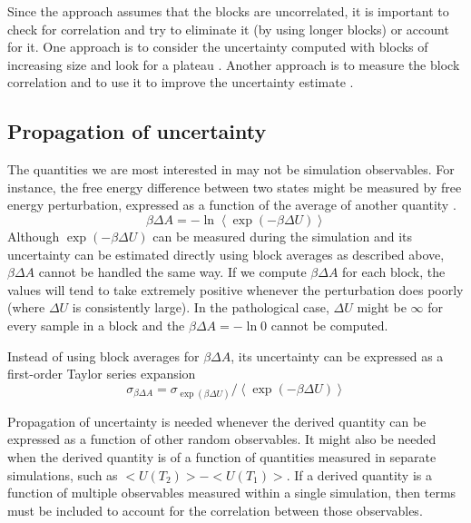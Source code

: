 Since the approach assumes that the blocks are uncorrelated, it is important to check for correlation and try to eliminate it (by using longer blocks) or account for it.  One approach is to consider the uncertainty computed with blocks of increasing size and look for a plateau \cite{Flyvbjerg-1989,Grossfield2009}.  Another approach is to measure the block correlation and to use it to improve the uncertainty estimate \cite{Kolafa1986}.

\subsection{Propagation of uncertainty}

The quantities we are most interested in may not be simulation observables.  For instance, the free energy difference between two states might be measured by free energy perturbation, expressed as a function of the average of another quantity \cite{Taylor1997}.
\begin{equation}
\beta \Delta A = -\ln \left< \exp \left(-\beta \Delta U\right) \right>
\end{equation}
Although $\exp(-\beta \Delta U)$ can be measured during the simulation and its uncertainty can be estimated directly using block averages as described above, $\beta \Delta A$ cannot be handled the same way.  If we compute $\beta \Delta A$ for each block, the values will tend to take extremely positive whenever the perturbation does poorly (where $\Delta U$ is consistently large).  In the pathological case, $\Delta U$ might be $\infty$ for every sample in a block and the $\beta \Delta A=-\ln 0$ cannot be computed. 


Instead of using block averages for $\beta \Delta A$, its uncertainty can be expressed as a first-order Taylor series expansion
\begin{equation}
  \sigma_{\beta \Delta A} = \sigma_{\exp(\beta \Delta U)} / \left< \exp \left(-\beta \Delta U\right) \right>
  \label{eq:propagation_bDA}
\end{equation}

Propagation of uncertainty is needed whenever the derived quantity can be expressed as a function of other random observables.  It might also be needed when the derived quantity is of a function of quantities measured in separate simulations, such as $<U(T_2)>-<U(T_1)>$.  If a derived quantity is a function of multiple observables measured within a single simulation, then terms must be included to account for the correlation between those observables.

